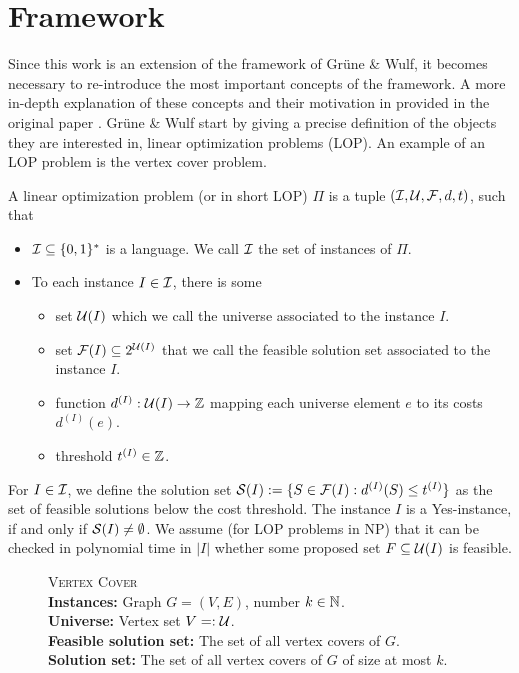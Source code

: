 \section{Framework}
\label{sec:framework} 

Since this work is an extension of the framework of Grüne \& Wulf, it becomes necessary to re-introduce the most important concepts of the framework. 
A more in-depth explanation of these concepts and their motivation in provided in the original paper \cite{gruene2024completeness}.
Grüne \& Wulf start by giving a precise definition of the objects they are interested in, linear optimization problems (LOP).
An example of an LOP problem is the vertex cover problem.

\begin{definition}
\label{def:LOSPP}
    A linear optimization problem (or in short LOP)  $\Pi$ is a tuple $(\mathcal{I}, \mathcal{U}, \mathcal{F}, d, t)$, such that
    \begin{itemize}
        \item $\mathcal{I} \subseteq \{0,1\}^*$ is a language. We call $\mathcal{I}$ the set of instances of $\Pi$.
        \item To each instance $I \in \mathcal{I}$, there is some
        \begin{itemize}
            \item set $\mathcal{U}(I)$ which we call the universe associated to the instance $I$.
            \item set $\mathcal{F}(I) \subseteq 2^{\mathcal{U}(I)}$ that we call the feasible solution set associated to the instance $I$. 
            \item function $d^{(I)}: \mathcal{U}(I) \rightarrow \mathbb{Z}$ mapping each universe element $e$ to its costs $d^{(I)}(e)$.
            \item threshold $t^{(I)} \in \mathbb{Z}$. 
        \end{itemize}
    \end{itemize}
    For $I \in \mathcal{I}$, we define the solution set $\mathcal{S}(I) := \{ S \in \mathcal{F}(I) : d^{(I)}(S) \leq t^{(I)} \}$ as the set of feasible solutions below the cost threshold. 
    The instance $I$ is a Yes-instance, if and only if $\mathcal{S}(I) \neq \emptyset$.
    We assume (for LOP problems in NP) that it can be checked in polynomial time in $|I|$ whether some proposed set $F \subseteq \mathcal{U}(I)$ is feasible.
\end{definition}

\begin{description}
    \item[]\textsc{Vertex Cover}\hfill\\
    \textbf{Instances:} Graph $G = (V, E)$, number $k \in \mathbb{N}$.\\
    \textbf{Universe:} Vertex set $V =: \mathcal{U}$.\\
    \textbf{Feasible solution set:} The set of all vertex covers of $G$.\\
    \textbf{Solution set:} The set of all vertex covers of $G$ of size at most $k$.
\end{description}


